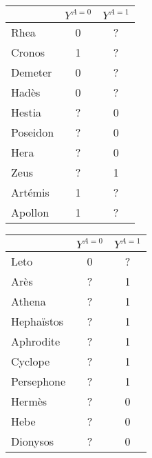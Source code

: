 \documentclass{standalone}
\begin{document}
\begin{tabular}{l|c|c|}
	& $Y^{A = 0} $ & $Y^{A = 1}$ \\
	\hline
	Rhea & 0 & ?\\
	Cronos & 1 & ?\\
	Demeter &0 & ?\\
	Hadès & 0 & ?\\
	Hestia & ? & 0\\
	Poseidon & ? & 0 \\
	Hera & ? & 0\\
	Zeus & ? &1 \\
	Artémis & 1 & ?\\
	Apollon& 1 & ?
\end{tabular}
\begin{tabular}{l|c|c|}
	& $Y^{A = 0} $ & $Y^{A = 1}$ \\
	\hline
	Leto & 0 & ?\\
	Arès & ?  & 1\\
	Athena & ?  & 1\\
	Hephaïstos & ?  & 1\\
	Aphrodite & ?  & 1 \\
	Cyclope & ?  & 1\\
	Persephone & ?  & 1 \\
	Hermès &? & 0\\
	Hebe &? & 0 \\
	Dionysos &? & 0
\end{tabular}
\end{document}
